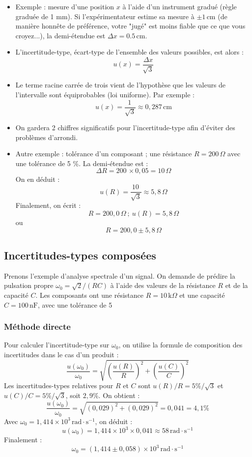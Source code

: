 \documentclass[10pt]{article}
\begin{document}
\begin{multicols}{2}
\begin{itemize}
    \item Exemple : mesure d’une position \(x\) à l’aide d’un instrument gradué (règle graduée de 1 mm). 
    Si l’expérimentateur estime sa mesure à \(\pm 1 \, \text{cm}\) (de manière honnête de préférence, votre "jugé" est moins fiable que ce que vous croyez...), la demi-étendue est \(\Delta x = 0.5 \, \text{cm}\).
    \item L’incertitude-type, écart-type de l’ensemble des valeurs possibles, est alors :
    \[
    u(x) = \frac{\Delta x}{\sqrt{3}}
    \]
    \item Le terme racine carrée de trois vient de l’hypothèse que les valeurs de l’intervalle sont équiprobables (loi uniforme). Par exemple :
    \[
    u(x) = \frac{1 \, }{\sqrt{3}} \approx 0{,}287 \, \text{cm}
    \]
    \item On gardera 2 chiffres significatifs pour l’incertitude-type afin d’éviter des problèmes d’arrondi.
    \item Autre exemple : tolérance d’un composant ; une résistance \(R = 200 \, \Omega\) avec une tolérance de 5 \%. La demi-étendue est :
    \[
    \Delta R = 200 \, \times 0{,}05 = 10 \, \Omega
    \]
    On en déduit :
    \[
    u(R) = \frac{10 \, }{\sqrt{3}} \approx 5{,}8 \, \Omega
    \]
    Finalement, on écrit :
    \[
    R = 200{,}0 \, \Omega \ ; \ u(R) = 5{,}8 \, \Omega
    \]
    ou 
    \[
    R = 200{,}0 \pm 5{,}8 \, \Omega
    \]
\end{itemize}



\subsection{Incertitudes-types composées}

Prenons l'exemple d'analyse spectrale d’un signal. On demande de prédire la pulsation propre \(\omega_0 = \sqrt{2} / (RC)\) à l’aide des valeurs de la résistance \(R\) et de la capacité \(C\). Les composants ont une résistance \(R = 10 \, \text{k}\Omega\) et une capacité \(C = 100 \, \text{nF}\), avec une tolérance de 5 %

\subsubsection{Méthode directe}

Pour calculer l’incertitude-type sur \(\omega_0\), on utilise la formule de composition des incertitudes dans le cas d’un produit :
\[
\frac{u(\omega_0)}{\omega_0} = \sqrt{\left( \frac{u(R)}{R} \right)^2 + \left( \frac{u(C)}{C} \right)^2}
\]
Les incertitudes-types relatives pour \(R\) et \(C\) sont \(u(R)/R = 5\% / \sqrt{3}\) et \(u(C)/C = 5\% / \sqrt{3}\), soit \(2,9\%\). On obtient :
\[
\frac{u(\omega_0)}{\omega_0} = \sqrt{(0,029)^2 + (0,029)^2} = 0,041 = 4,1\%
\]
Avec \(\omega_0 = 1,414 \times 10^3 \, \text{rad} \cdot \text{s}^{-1}\), on déduit :
\[
u(\omega_0) = 1,414 \times 10^3 \times 0,041 \approx 58 \, \text{rad} \cdot \text{s}^{-1}
\]
Finalement :
\[
\omega_0 = (1,414 \pm 0,058) \times 10^3 \, \text{rad} \cdot \text{s}^{-1}
\]


\end{multicols}
\end{document}
